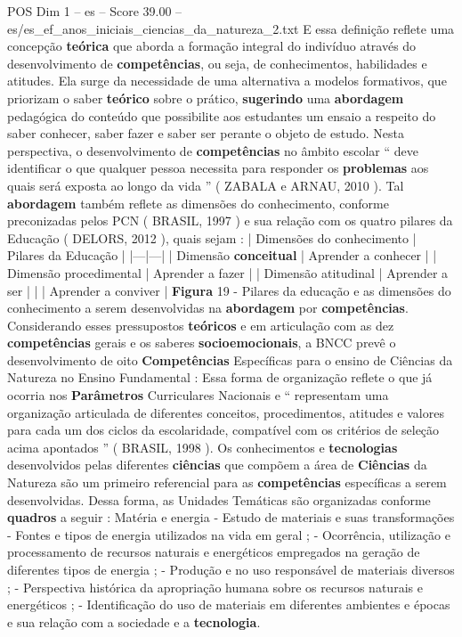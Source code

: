 \begin{textsample}{POS Dim 1 – es – Score 39.00 – es/es\_ef\_anos\_iniciais\_ciencias\_da\_natureza\_2.txt}
E essa definição reflete uma concepção \textbf{teórica} que aborda a formação integral do indivíduo através do desenvolvimento de \textbf{competências}, ou seja, de conhecimentos, habilidades e atitudes.
Ela surge da necessidade de uma alternativa a modelos formativos, que priorizam o saber \textbf{teórico} sobre o prático, \textbf{sugerindo} uma \textbf{abordagem} pedagógica do conteúdo que possibilite aos estudantes um ensaio a respeito do saber conhecer, saber fazer e saber ser perante o objeto de estudo.
Nesta perspectiva, o desenvolvimento de \textbf{competências} no âmbito escolar “ deve identificar o que qualquer pessoa necessita para responder os \textbf{problemas} aos quais será exposta ao longo da vida ” ( ZABALA e ARNAU, 2010 ).
Tal \textbf{abordagem} também reflete as dimensões do conhecimento, conforme preconizadas pelos PCN ( BRASIL, 1997 ) e sua relação com os quatro pilares da Educação ( DELORS, 2012 ), quais sejam : | Dimensões do conhecimento | Pilares da Educação | |---|---| | Dimensão \textbf{conceitual} | Aprender a conhecer | | Dimensão procedimental | Aprender a fazer | | Dimensão atitudinal | Aprender a ser | | | Aprender a conviver | \textbf{Figura} 19 - Pilares da educação e as dimensões do conhecimento a serem desenvolvidas na \textbf{abordagem} por \textbf{competências}.
Considerando esses pressupostos \textbf{teóricos} e em articulação com as dez \textbf{competências} gerais e os saberes \textbf{socioemocionais}, a BNCC prevê o desenvolvimento de oito \textbf{Competências} Específicas para o ensino de Ciências da Natureza no Ensino Fundamental : Essa forma de organização reflete o que já ocorria nos \textbf{Parâmetros} Curriculares Nacionais e “ representam uma organização articulada de diferentes conceitos, procedimentos, atitudes e valores para cada um dos ciclos da escolaridade, compatível com os critérios de seleção acima apontados ” ( BRASIL, 1998 ).
Os conhecimentos e \textbf{tecnologias} desenvolvidos pelas diferentes \textbf{ciências} que compõem a área de \textbf{Ciências} da Natureza são um primeiro referencial para as \textbf{competências} específicas a serem desenvolvidas.
Dessa forma, as Unidades Temáticas são organizadas conforme \textbf{quadros} a seguir : Matéria e energia - Estudo de materiais e suas transformações - Fontes e tipos de energia utilizados na vida em geral ; - Ocorrência, utilização e processamento de recursos naturais e energéticos empregados na geração de diferentes tipos de energia ; - Produção e no uso responsável de materiais diversos ; - Perspectiva histórica da apropriação humana sobre os recursos naturais e energéticos ; - Identificação do uso de materiais em diferentes ambientes e épocas e sua relação com a sociedade e a \textbf{tecnologia}.

\end{textsample}
